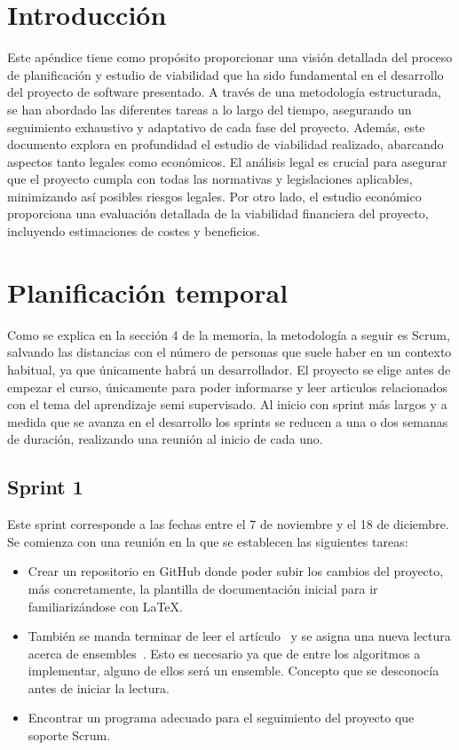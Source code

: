 
\section{Introducción}
Este apéndice tiene como propósito proporcionar una visión detallada del proceso de planificación y estudio de viabilidad que ha sido fundamental en el desarrollo del proyecto de software presentado. A través de una metodología estructurada, se han abordado las diferentes tareas a lo largo del tiempo, asegurando un seguimiento exhaustivo y adaptativo de cada fase del proyecto.
Además, este documento explora en profundidad el estudio de viabilidad realizado, abarcando aspectos tanto legales como económicos. El análisis legal es crucial para asegurar que el proyecto cumpla con todas las normativas y legislaciones aplicables, minimizando así posibles riesgos legales. Por otro lado, el estudio económico proporciona una evaluación detallada de la viabilidad financiera del proyecto, incluyendo estimaciones de costes y beneficios.

\section{Planificación temporal}
Como se explica en la sección 4 de la memoria, la metodología a seguir es Scrum, salvando las distancias con el número de personas que suele haber en un contexto habitual, ya que únicamente habrá un desarrollador.
El proyecto se elige antes de empezar el curso, únicamente para poder informarse y leer articulos relacionados con el tema del aprendizaje semi supervisado. Al inicio con sprint más largos y a medida que se avanza en el desarrollo los sprints se reducen a una o dos semanas de duración, realizando una reunión al inicio de cada uno.


\subsection{Sprint 1}
Este sprint corresponde a las fechas entre el 7 de noviembre y el 18 de diciembre. Se comienza con una reunión en la que se establecen las siguientes tareas:\\
\begin{itemize}
	\item Crear un repositorio en GitHub donde poder subir los cambios del proyecto, más concretamente, la plantilla de documentación inicial para ir familiarizándose con \LaTeX.
	\item También se manda terminar de leer el artículo~\cite{Engelen:semi-supervised} y se asigna una nueva lectura acerca de ensembles~\cite{ensembles}. Esto es necesario ya que de entre los algoritmos a implementar, alguno de ellos será un ensemble. Concepto que se desconocía antes de iniciar la lectura.
	\item Encontrar un programa adecuado para el seguimiento del proyecto que soporte Scrum.
\end{itemize}

